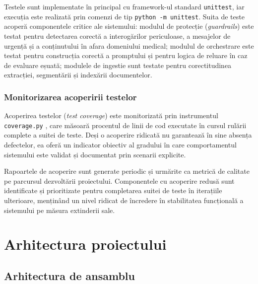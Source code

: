 \documentclass[12pt, a4paper, oneside, romanian]{teza-upb}
\begin{document}
Testele sunt implementate în principal cu framework-ul standard \texttt{unittest}, iar execuția este realizată prin comenzi de tip \texttt{python -m unittest}. Suita de teste acoperă componentele critice ale sistemului: modulul de protecție (\textit{guardrails}) este testat pentru detectarea corectă a interogărilor periculoase, a mesajelor de urgență și a conținutului în afara domeniului medical; modulul de orchestrare este testat pentru construcția corectă a promptului și pentru logica de reluare în caz de evaluare eșuată; modulele de ingestie sunt testate pentru corectitudinea extracției, segmentării și indexării documentelor.

\subsection{Monitorizarea acoperirii testelor}

Acoperirea testelor (\textit{test coverage}) este monitorizată prin instrumentul \texttt{coverage.py} \cite{coveragepy_doc}, care măsoară procentul de linii de cod executate în cursul rulării complete a suitei de teste. Deși o acoperire ridicată nu garantează în sine absența defectelor, ea oferă un indicator obiectiv al gradului în care comportamentul sistemului este validat și documentat prin scenarii explicite.

Rapoartele de acoperire sunt generate periodic și urmărite ca metrică de calitate pe parcursul dezvoltării proiectului. Componentele cu acoperire redusă sunt identificate și prioritizate pentru completarea suitei de teste în iterațiile ulterioare, menținând un nivel ridicat de încredere în stabilitatea funcțională a sistemului pe măsura extinderii sale.

\chapter{Arhitectura proiectului}

\section{Arhitectura de ansamblu}
\label{sec:ansamblu}
\end{document}
